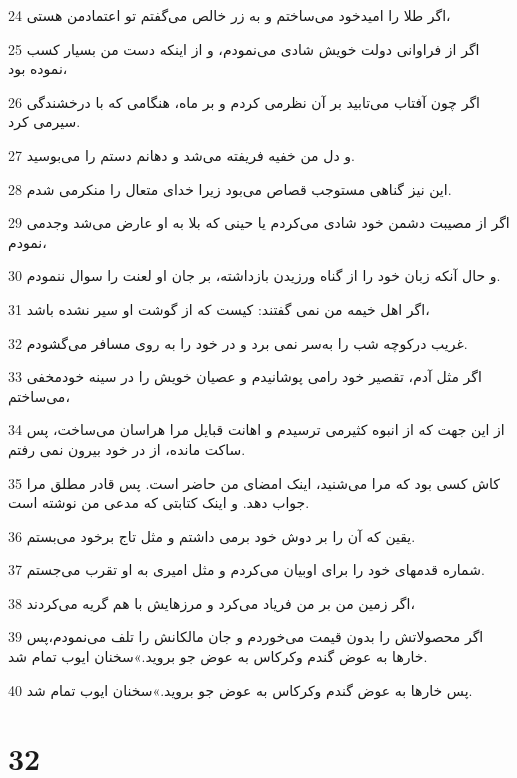 \par 24 اگر طلا را امیدخود می‌ساختم و به زر خالص می‌گفتم تو اعتمادمن هستی،
\par 25 اگر از فراوانی دولت خویش شادی می‌نمودم، و از اینکه دست من بسیار کسب نموده بود،
\par 26 اگر چون آفتاب می‌تابید بر آن نظرمی کردم و بر ماه، هنگامی که با درخشندگی سیرمی کرد.
\par 27 و دل من خفیه فریفته می‌شد و دهانم دستم را می‌بوسید.
\par 28 این نیز گناهی مستوجب قصاص می‌بود زیرا خدای متعال را منکرمی شدم.
\par 29 اگر از مصیبت دشمن خود شادی می‌کردم یا حینی که بلا به او عارض می‌شد وجدمی نمودم،
\par 30 و حال آنکه زبان خود را از گناه ورزیدن بازداشته، بر جان او لعنت را سوال ننمودم.
\par 31 اگر اهل خیمه من نمی گفتند: کیست که از گوشت او سیر نشده باشد،
\par 32 غریب درکوچه شب را به‌سر نمی برد و در خود را به روی مسافر می‌گشودم.
\par 33 اگر مثل آدم، تقصیر خود رامی پوشانیدم و عصیان خویش را در سینه خودمخفی می‌ساختم،
\par 34 از این جهت که از انبوه کثیرمی ترسیدم و اهانت قبایل مرا هراسان می‌ساخت، پس ساکت مانده، از در خود بیرون نمی رفتم.
\par 35 کاش کسی بود که مرا می‌شنید، اینک امضای من حاضر است. پس قادر مطلق مرا جواب دهد. و اینک کتابتی که مدعی من نوشته است.
\par 36 یقین که آن را بر دوش خود برمی داشتم و مثل تاج برخود می‌بستم.
\par 37 شماره قدمهای خود را برای اوبیان می‌کردم و مثل امیری به او تقرب می‌جستم.
\par 38 اگر زمین من بر من فریاد می‌کرد و مرزهایش با هم گریه می‌کردند،
\par 39 اگر محصولاتش را بدون قیمت می‌خوردم و جان مالکانش را تلف می‌نمودم،پس خارها به عوض گندم وکرکاس به عوض جو بروید.»سخنان ایوب تمام شد.
\par 40 پس خارها به عوض گندم وکرکاس به عوض جو بروید.»سخنان ایوب تمام شد.
 
\chapter{32}

